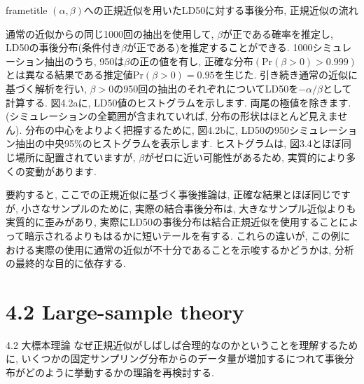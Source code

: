 \documentclass[10pt,dvipdfmx,a4]{beamer}
\newcommand{\dbox}[1]{\begin{beamercolorbox}[wd=122mm, sep=0pt, shadow=false, rounded=false]{frametitle} { #1}\end{beamercolorbox}}
\begin{document}
\begin{frame}
\dbox{$(\alpha,\beta)$への正規近似を用いたLD50に対する事後分布, 正規近似の流れ}
通常の近似からの同じ1000回の抽出を使用して, $\beta$が正である確率を推定し, LD50の事後分布(条件付き$\beta$が正である)を推定することができる.
1000シミュレーション抽出のうち, 950は$\beta$の正の値を有し, 正確な分布$(\text{Pr}(\beta>0)>0.999)$とは異なる結果である推定値$\text{Pr}(\beta>0)=0.95$を生じた.
引き続き通常の近似に基づく解析を行い, $\beta>0$の950回の抽出のそれぞれについてLD50を$-\alpha/\beta$として計算する.
図4.2aに, LD50値のヒストグラムを示します.
両尾の極値を除きます.
(シミュレーションの全範囲が含まれていれば, 分布の形状はほとんど見えません).
分布の中心をよりよく把握するために, 図4.2bに, LD50の950シミュレーション抽出の中央95\%のヒストグラムを表示します.
ヒストグラムは, 図3.4とほぼ同じ場所に配置されていますが, $\beta$がゼロに近い可能性があるため, 実質的により多くの変動があります.

要約すると, ここでの正規近似に基づく事後推論は, 正確な結果とほぼ同じですが, 小さなサンプルのために, 実際の結合事後分布は, 大きなサンプル近似よりも実質的に歪みがあり, 実際にLD50の事後分布は結合正規近似を使用することによって暗示されるよりもはるかに短いテールを有する.
これらの違いが, この例における実際の使用に通常の近似が不十分であることを示唆するかどうかは, 分析の最終的な目的に依存する.
\end{frame}

\section{4.2 Large-sample theory}
\begin{frame}{4.2 大標本理論}
なぜ正規近似がしばしば合理的なのかということを理解するために, いくつかの固定サンプリング分布からのデータ量が増加するにつれて事後分布がどのように挙動するかの理論を再検討する.
\end{frame}

\end{document}
